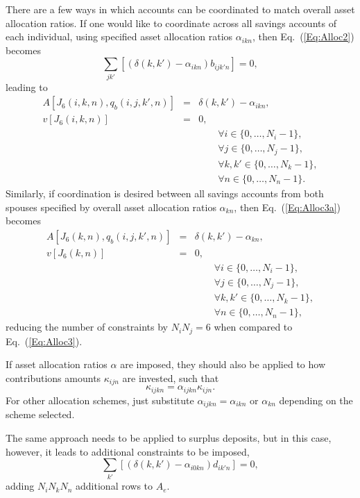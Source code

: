 \documentclass{report}[fleqn,12pt]
\begin{document}
There are a few ways in which accounts can be coordinated to match
overall asset allocation ratios.
If one would like to coordinate across all savings accounts of each individual,
using specified asset allocation ratios $\alpha_{ikn}$,
then Eq.~(\ref{Eq:Alloc2}) becomes
\begin{equation}
	\label{Eq:Alloc2a}
	\sum_{jk'} [(\delta(k, k') - \alpha_{ikn}) b_{ijk'n}] = 0,
\end{equation}
leading to
\begin{eqnarray}
	\label{Eq:Alloc3a}
	A[J_6(i, k, n), q_b(i, j, k', n)] &=& \delta(k, k') - \alpha_{ikn}, \nonumber\\
	v[J_6(i, k, n)] &=& 0, \\
	&&\qquad\forall i \in \{0,\ldots, N_i-1\},\nonumber\\
	&&\qquad\forall j \in \{0,\ldots, N_j-1\},\nonumber\\
	&&\qquad\forall k,k' \in \{0,\ldots, N_k-1\},\nonumber\\
	&&\qquad\forall n \in \{0,\ldots, N_n-1\}. \nonumber
\end{eqnarray}
Similarly, if coordination is desired between all savings accounts from both spouses
specified by overall asset allocation ratios $\alpha_{kn}$,
then Eq.~(\ref{Eq:Alloc3a}) becomes
\begin{eqnarray}
	\label{Eq:Alloc3b}
	A[J_6(k, n), q_b(i, j, k', n)] &=& \delta(k, k') - \alpha_{kn}, \nonumber\\
	v[J_6(k, n)] &=& 0, \\
	&&\qquad\forall i \in \{0,\ldots, N_i-1\},\nonumber\\
	&&\qquad\forall j \in \{0,\ldots, N_j-1\},\nonumber\\
	&&\qquad\forall k,k' \in \{0,\ldots, N_k-1\},\nonumber\\
	&&\qquad\forall n \in \{0,\ldots, N_n-1\}, \nonumber
\end{eqnarray}
reducing the number of constraints by $N_iN_j=6$ when compared to Eq.~(\ref{Eq:Alloc3}).

If asset allocation ratios $\alpha$ are imposed,
they should also be applied to how
contributions amounts $\kappa_{ijn}$ are invested, such that 
\begin{equation}
	\kappa_{ijkn} = \alpha_{ijkn} \kappa_{ijn}.
\end{equation}
For other allocation schemes, just substitute $\alpha_{ijkn} = \alpha_{ikn}$ or $\alpha_{kn}$
depending on the scheme selected.

The same approach needs to be applied to surplus deposits, but
in this case, however, it leads to
additional constraints to be imposed,
\begin{equation}
	\sum_{k'} [(\delta(k, k') - \alpha_{i0kn}) d_{ik'n}] = 0,
\end{equation}
adding $N_iN_kN_n$ additional rows to $A_e$.
\end{document}
